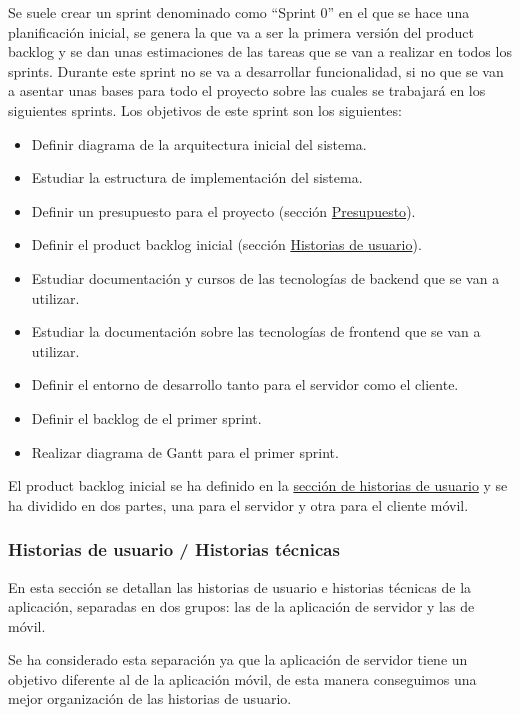 Se suele crear un sprint denominado como ``Sprint 0'' en el que se hace una planificación inicial, se genera la que va a ser la primera versión del product backlog y se dan unas estimaciones de las tareas que se van a realizar en todos los sprints.
Durante este sprint no se va a desarrollar funcionalidad, si no que se van a asentar unas bases para todo el proyecto sobre las cuales se trabajará en los siguientes sprints.
Los objetivos de este sprint son los siguientes:

\begin{itemize}
    \item Definir diagrama de la arquitectura inicial del sistema.
    \item Estudiar la estructura de implementación del sistema.
    \item Definir un presupuesto para el proyecto (sección \hyperref[sec:presupuesto]{Presupuesto}).
    \item Definir el product backlog inicial (sección \hyperref[sec:historias-de-usuario]{Historias de usuario}).
    \item Estudiar documentación y cursos de las tecnologías de backend que se van a utilizar.
    \item Estudiar la documentación sobre las tecnologías de frontend que se van a utilizar.
    \item Definir el entorno de desarrollo tanto para el servidor como el cliente.
    \item Definir el backlog de el primer sprint.
    \item Realizar diagrama de Gantt para el primer sprint.
\end{itemize}

El product backlog inicial se ha definido en la \hyperref[sec:historias-de-usuario]{sección de historias de usuario} y se ha dividido en dos partes, una para el servidor y otra para el cliente móvil.

\subsubsection{Historias de usuario / Historias técnicas}
\label{sec:historias-de-usuario}
En esta sección se detallan las historias de usuario e historias técnicas de la aplicación, separadas en dos grupos: las de la aplicación de servidor y las de móvil.

Se ha considerado esta separación ya que la aplicación de servidor tiene un objetivo diferente al de la aplicación móvil, de esta manera conseguimos una mejor organización de las historias de usuario.

